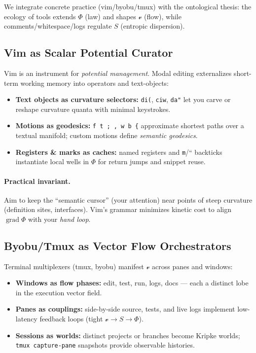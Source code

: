 \documentclass[12pt,a4paper]{article}
\theoremstyle{plain}
\theoremstyle{definition}
\theoremstyle{remark}
\newcommand{\Phifield}{\Phi}
\newcommand{\vfield}{\mathcal{v}}
\newcommand{\Sfield}{S}
\begin{document}
We integrate concrete practice (vim/byobu/tmux) with the ontological thesis: the ecology of tools extends $\Phifield$ (law) and shapes $\vfield$ (flow), while comments/whitespace/logs regulate $\Sfield$ (entropic dispersion).

\subsection{Vim as Scalar Potential Curator}
Vim is an instrument for \emph{potential management}. Modal editing externalizes short-term working memory into operators and text-objects:
\begin{itemize}
  \item \textbf{Text objects as curvature selectors:} \verb|di(|, \verb|ciw|, \verb|da"| let you carve or reshape curvature quanta with minimal keystrokes.
  \item \textbf{Motions as geodesics:} \verb|f t ; , w b {| approximate shortest paths over a textual manifold; custom motions define \emph{semantic geodesics}.
  \item \textbf{Registers \& marks as caches:} named registers and \verb|m|/`` backticks instantiate local wells in $\Phifield$ for return jumps and snippet reuse.
\end{itemize}

\paragraph{Practical invariant.}
Aim to keep the “semantic cursor” (your attention) near points of steep curvature (definition sites, interfaces). Vim’s grammar minimizes kinetic cost to align $\operatorname{grad}\Phifield$ with your \emph{hand loop}.

\subsection{Byobu/Tmux as Vector Flow Orchestrators}
Terminal multiplexers (tmux, byobu) manifest $\vfield$ across panes and windows:
\begin{itemize}
  \item \textbf{Windows as flow phases:} edit, test, run, logs, docs — each a distinct lobe in the execution vector field.
  \item \textbf{Panes as couplings:} side-by-side source, tests, and live logs implement low-latency feedback loops (tight $\vfield\!\to\!\Sfield\!\to\!\Phifield$).
  \item \textbf{Sessions as worlds:} distinct projects or branches become Kripke worlds; \verb|tmux capture-pane| snapshots provide observable histories.
\end{itemize}
\end{document}
